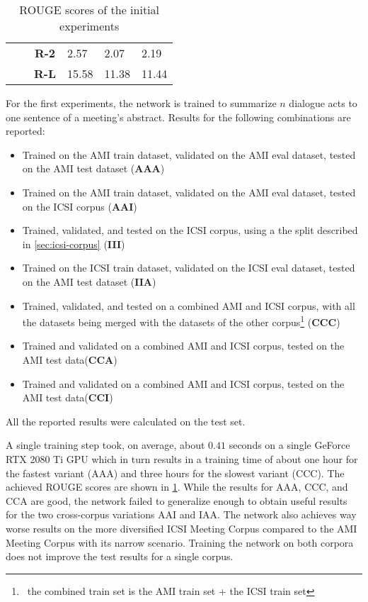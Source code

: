 \begin{table}[h]
\begin{tabular}{c|l|clll}
                              &                                                                                            & \textbf{R-2}    & 2.57         & 2.07         & 2.19       \\
                              &                                                                                            & \textbf{R-L}    & 15.58         & 11.38         & 11.44       \\ \hline
\end{tabular}
\caption{ROUGE scores of the initial experiments}
\label{tab:initial-experiment-rouge}
\end{table}

For the first experiments, the network is trained to summarize $n$ dialogue acts to one sentence of a meeting's abstract.
Results for the following combinations are reported:

\begin{itemize}
\item Trained on the AMI train dataset, validated on the AMI eval dataset, tested on the AMI test dataset (\textbf{AAA})
\item Trained on the AMI train dataset, validated on the AMI eval dataset, tested on the ICSI corpus (\textbf{AAI})
\item Trained, validated, and tested on the ICSI corpus, using a the split described in \cref{sec:icsi-corpus} (\textbf{III})
\item Trained on the ICSI train dataset, validated on the ICSI eval dataset, tested on the AMI test dataset (\textbf{IIA})
\item Trained, validated, and tested on a combined AMI and ICSI corpus, with all the datasets being merged with the datasets of the other corpus\footnote{\Eg\ the combined train set is the AMI train set + the ICSI train set} (\textbf{CCC})
\item Trained and validated on a combined AMI and ICSI corpus, tested on the AMI test data(\textbf{CCA})
\item Trained and validated on a combined AMI and ICSI corpus, tested on the AMI test data(\textbf{CCI})
\end{itemize}

All the reported results were calculated on the test set.

A single training step took, on average, about $0.41$ seconds on a single GeForce RTX 2080 Ti GPU which in turn results in a training time of about one hour for the fastest variant (AAA) and three hours for the slowest variant (CCC).
The achieved ROUGE scores are shown in \cref{tab:initial-experiment-rouge}.
While the results for AAA, CCC, and CCA are good, the network failed to generalize enough to obtain useful results for the two cross-corpus variations AAI and IAA.
The network also achieves way worse results on the more diversified ICSI Meeting Corpus compared to the AMI Meeting Corpus with its narrow scenario.
Training the network on both corpora does not improve the test results for a single corpus.

